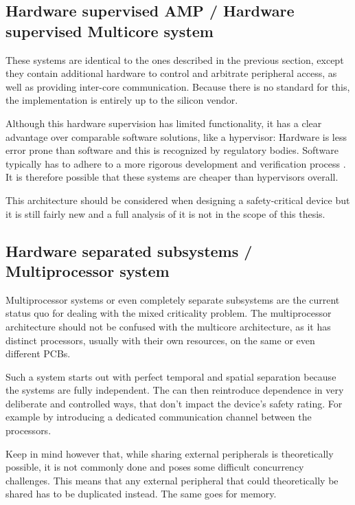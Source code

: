 \subsection{Hardware supervised AMP / Hardware supervised Multicore system}
These systems are identical to the ones described in the previous section, except they contain additional hardware to control and arbitrate peripheral access, as well as providing inter-core communication.
Because there is no standard for this, the implementation is entirely up to the silicon vendor. 

Although this hardware supervision has limited functionality, it has a clear advantage over comparable software solutions, like a hypervisor: Hardware is less error prone than software and this is recognized by regulatory bodies. Software typically has to adhere to a more rigorous development and verification process \cite{IEC.2010-3}. It is therefore possible that these systems are cheaper than hypervisors overall. 

This architecture should be considered when designing a safety-critical device but it is still fairly new and a full analysis of it is not in the scope of this thesis.
\subsection{Hardware separated subsystems / Multiprocessor system}
Multiprocessor systems or even completely separate subsystems are the current status quo for dealing with the mixed criticality problem. The multiprocessor architecture should not be confused with the multicore architecture, as it has distinct processors, usually with their own resources, on the same or even different \gls{PCB}s.

Such a system starts out with perfect temporal and spatial separation because the systems are fully independent. The \mfg{} can then reintroduce dependence in very deliberate and controlled ways, that don't impact the device's safety rating. For example by introducing a dedicated communication channel between the processors. 

Keep in mind however that, while sharing external peripherals is theoretically possible, it is not commonly done and poses some difficult concurrency challenges. This means that any external peripheral that could theoretically be shared has to be duplicated instead. The same goes for memory.

